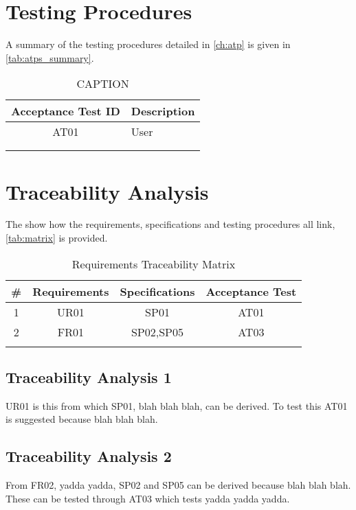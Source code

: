 \documentclass[class=report,11pt,crop=false]{standalone}
\begin{document}
\section{Testing Procedures}
A summary of the testing procedures detailed in \autoref{ch:atp} is given in \autoref{tab:atps_summary}.
\begin{table}[h]
    \centering
    \caption{CAPTION}
    \label{tab:atps_summary}
    \begin{tabular}{c|l}
        \hline
        \textbf{Acceptance Test ID} & \textbf{Description} \\
        \hline
         AT01 & User \\
         &  \\
         &  \\
         \hline
    \end{tabular}
\end{table}

\section{Traceability Analysis}
The show how the requirements, specifications and testing procedures all link, \autoref{tab:matrix} is provided.

\begin{table}[h]
    \centering
    \caption{Requirements Traceability Matrix}
    \label{tab:matrix}
    \begin{tabular}{|c|c|c|c|}
        \hline
        \# & Requirements & Specifications  & Acceptance Test\\
        \hline
         1 & UR01 &  SP01 & AT01 \\
         2 & FR01 & SP02,SP05 & AT03 \\
         & &  & \\
    \hline
    \end{tabular}
\end{table}

\subsection{Traceability Analysis 1}
UR01 is this from which SP01, blah blah blah, can be derived. To test this AT01 is suggested because blah blah blah.

\subsection{Traceability Analysis 2}
From FR02, yadda yadda, SP02 and SP05 can be derived because blah blah blah. These can be tested through AT03 which tests yadda yadda yadda.


\ifstandalone

\fi
\end{document}
